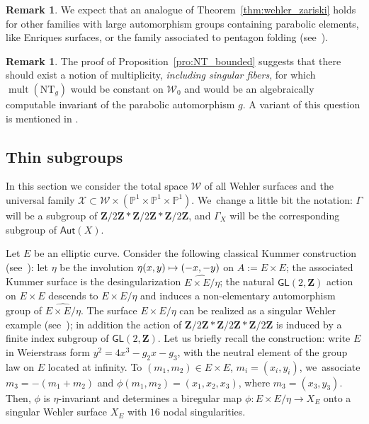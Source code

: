 \documentclass[JEP,XML,SOM,Unicode,published]{cedram}
\newcommand\mto{\mathchoice{\longmapsto}{\mapsto}{\mapsto}{\mapsto}}
\newcommand{\pu}{{\mathbb{P}^1}}
\DeclareMathOperator{\mult}{mult}
\def\Z{\mathbf{Z}}
\newcommand{\cW}{\mathcal{W}}
\newcommand{\NT}{{\mathrm{NT}}}
\newcommand\Aut{\mathsf{Aut}}
\newcommand\GL{{\mathsf{GL}}}
\theoremstyle{plain}
\theoremstyle{definition}
\newtheorem{rem}[thm]{Remark}
\begin{document}
\begin{rem}
We expect that an analogue of Theorem~\ref{thm:wehler_zariski} holds for other families
with large automorphism groups containing parabolic elements, like Enriques surfaces, or the family associated to pentagon folding (see~\cite{Simons}).
\end{rem}

\begin{rem}
The proof of Proposition~\ref{pro:NT_bounded} suggests that
there should exist a notion of multiplicity, {\textit{including singular fibers}},
for which $\mult(\NT_g)$ would be constant on $\cW_0$ and would be an algebraically
computable invariant of the parabolic automorphism $g$. A variant of this question is mentioned in \cite[Rem.\,7.7.4]{duistermaat}.
\end{rem}

\subsection{Thin subgroups}\label{subs:thin}
In this section we consider the total
space $ \cW$ of all Wehler surfaces and the universal family
$\mathcal X\subset \cW\times (\pu\times \pu\times \pu)$. We~change a
little bit the notation: $\Gamma$ will be a subgroup of $\Z/2\Z\ast\Z/2\Z\ast\Z/2\Z$, and
$\Gamma_{X}$ will be the corresponding subgroup of $\Aut(X)$.

Let $E$ be an elliptic curve. Consider the following classical Kummer construction (see~\cite[\S 4]{finite_orbits}): let $\eta$ be
the involution $\eta (x,y)\mto (-x,-y)$ on $A:=E\times E$; the associated Kummer surface is
the desingularization $\widehat{E\times E/\eta}$; the natural $\GL(2, \Z)$ action on $E\times E$ descends
to $E\times E/\eta$ and
induces a non-elementary automorphism group of $\widehat{E\times E/\eta}$.
The surface $E\times E/\eta$ can be realized as a singular Wehler example
(see~\cite[\S 8.2]{Cantat:Panorama-Synthese}); in addition the action of
$\Z/2\Z\ast\Z/2\Z\ast\Z/2\Z$ is induced by a finite index subgroup of $\GL(2, \Z)$.
Let us briefly recall the construction: write
$E$ in Weierstrass form $y^2 = 4x^3 - g_2x - g_3$, with the neutral element of the group law on
$E$ located at infinity.
To $(m_1, m_2)\in E\times E$, $m_i = (x_i, y_i)$, we~associate $m_3 = - (m_1+m_2)$ and
$\phi(m_1, m_2 ) = (x_1, x_2, x_3)$, where $m_3 = (x_3, y_3)$. Then, $\phi$ is $\eta$-invariant and determines
a biregular map
$\phi: E\times E/\eta\to X_E$ onto a singular Wehler surface $X_E$ with $16$ nodal singularities.
\end{document}
